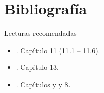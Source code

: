 \documentclass[9pt, aspectratio=169]{beamer}
\begin{document}
\section*{Bibliografía}
\begin{frame}[allowframebreaks]{Lecturas recomendadas}
\begin{itemize}
 \item {}. Capítulo 11 (11.1 -- 11.6).
 \item {}. Capítulo 13.
 \item {}. Capítulos y y 8.
\end{itemize}

\end{frame}
\end{document}
